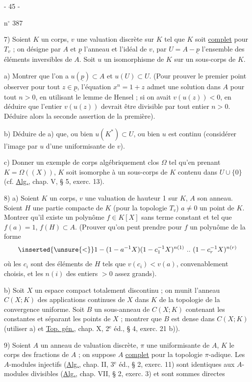 \begin{center}- 45 -\end{center}
\hfill n$^\circ$ 387

7) Soient $K$ un corps, $v$ une valuation discrète sur $K$ tel que $K$ soit \uline{complet} pour $T_v$ ; on désigne par $A$ et $\underline p$ l'anneau et l'idéal de $v$, par $U=A-\underline p$ l'ensemble des éléments inversibles de $A$. Soit $u$ un isomorphisme de $K$ sur un sous-corps de $K$.

a) Montrer que l'on a $u(\underline p)\subset A$ et $u(U)\subset U$. (Pour prouver le premier point observer pour tout $z\in\underline p$, l'équation $x^n=1+z$ admet une solution dans $A$ pour tout $n>0$, en utilisant le lemme de Hensel ; si on avait $v(u(z))<0$, en déduire que l'entier $v(u(z))$ devrait être divisible par tout entier $n>0$. Déduire alors la seconde assertion de la première).

b) Déduire de a) que, ou bien $u(K^*)\subset U$, ou bien $u$ est continu (considérer l'image par $u$ d'une uniformisante de $v$).

c) Donner un exemple de corps algébriquement clos $\Omega$ tel qu'en prenant $K=\Omega((X))$, $K$ soit isomorphe à un sous-corps de $K$ contenu dans $U\cup\{0\}$ (cf. \uline{Alg.}, chap. V, § 5, exerc. 13).

8) a) Soient $K$ un corps, $v$ une valuation de hauteur 1 sur $K$, $A$ son anneau. Soient $H$ une partie compacte de $K$ (pour la topologie $T_v$) $a\ne0$ un point de $K$. Montrer qu'il existe un polynôme $f\in K[X]$ sans terme constant et tel que $f(a)=1$, $f(H)\subset A$. (Prouver qu'on peut prendre pour $f$ un polynôme de la forme
\[
\inserted{\unsure{<}}1-(1-a^{-1}X)(1-c_1^{-1}X)^{n(1)}\ ..\ (1-c_r^{-1}X)^{n(r)}
\]
où les $c_i$ sont des éléments de $H$ tels que $v(c_i)<v(a)$, convenablement choisis, et les $n(i)$ des entiers $>0$ assez grands).

b) Soit $X$ un espace compact totalement discontinu ; on munit l'anneau $C(X;K)$ des applications continues de $X$ dans $K$ de la topologie de la convergence uniforme. Soit $B$ un sous-anneau de $C(X;K)$ contenant les constantes et séparant les points de $X$ ; montrer que $B$ est dense dans $C(X;K)$ (utiliser a) et \uline{Top. gén.}, chap. X, 2$^{\mathrm e}$ éd., § 4, exerc. 21 b)).

9) Soient $A$ un anneau de valuation discrète, $\pi$ une uniformisante de $A$, $K$ le corps des fractions de $A$ ; on suppose $A$ \uline{complet} pour la topologie $\pi$-adique. Les $A$-modules injectifs (\uline{Alg.}, chap. II, 3$^{\mathrm e}$ éd., § 2, exerc. 11) sont identiques aux $A$-modules divisibles (\uline{Alg.}, chap. VII, § 2, exerc. 3) et sont sommes directes
